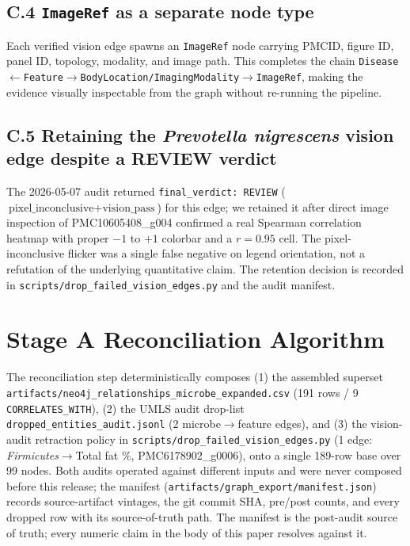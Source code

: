 \documentclass[10pt,twocolumn,letterpaper]{article}
\begin{document}
\subsection*{C.4 \texttt{ImageRef} as a separate node type}
\noindent Each verified vision edge spawns an \texttt{ImageRef} node
carrying PMCID, figure ID, panel ID, topology, modality, and image path.
This completes the chain
\texttt{Disease}$\leftarrow$\texttt{Feature}$\rightarrow$\texttt{BodyLocation/ImagingModality}$\rightarrow$\texttt{ImageRef},
making the evidence visually inspectable from the graph without re-running
the pipeline.

\subsection*{C.5 Retaining the \textit{Prevotella nigrescens} vision edge despite a REVIEW verdict}
\noindent The 2026-05-07 audit returned \texttt{final\_verdict: REVIEW}
($\text{pixel\_inconclusive} + \text{vision\_pass}$) for this edge; we
retained it after direct image inspection of PMC10605408\_g004 confirmed a
real Spearman correlation heatmap with proper $-1$ to $+1$ colorbar and a
$r{=}0.95$ cell. The pixel-inconclusive flicker was a single false
negative on legend orientation, not a refutation of the underlying
quantitative claim. The retention decision is recorded in
\texttt{scripts/drop\_failed\_vision\_edges.py} and the audit manifest.

\section{Stage A Reconciliation Algorithm}
\label{app:stagea}

The reconciliation step deterministically composes (1) the assembled
superset \texttt{artifacts/neo4j\_relationships\_microbe\_expanded.csv}
(191 rows / 9 \texttt{CORRELATES\_WITH}), (2) the UMLS audit drop-list
\texttt{dropped\_entities\_audit.jsonl} (2 microbe$\rightarrow$feature
edges), and (3) the vision-audit retraction policy in
\texttt{scripts/drop\_failed\_vision\_edges.py} (1 edge:
\textit{Firmicutes}$\rightarrow$Total fat \%, PMC6178902\_g0006), onto a
single 189-row base over 99 nodes. Both audits operated against different
inputs and were never composed before this release; the manifest
(\texttt{artifacts/graph\_export/manifest.json}) records source-artifact
vintages, the git commit SHA, pre/post counts, and every dropped row with
its source-of-truth path. The manifest is the post-audit source of truth;
every numeric claim in the body of this paper resolves against it.
\end{document}
